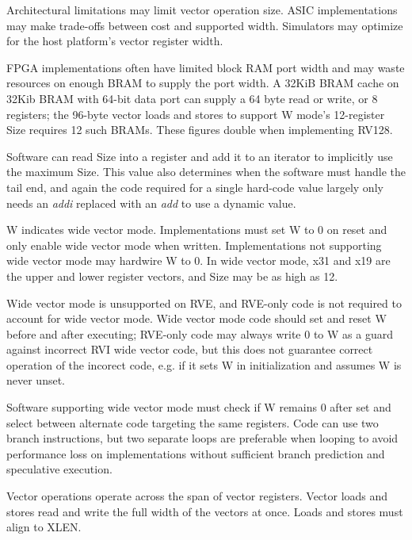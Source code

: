 \begin{commentary}

    Architectural limitations may limit vector operation size.  ASIC implementations
    may make trade-offs between cost and supported width.  Simulators may optimize
    for the host platform's vector register width.

    FPGA implementations often have limited block RAM port width and may waste
    resources on enough BRAM to supply the port width.  A 32KiB BRAM cache on 32Kib
    BRAM with 64-bit data port can supply a 64 byte read or write, or 8 registers;
    the 96-byte vector loads and stores to support W mode's 12-register Size
    requires 12 such BRAMs.  These figures double when implementing RV128.

    Software can read Size into a register and add it to an iterator to implicitly
    use the maximum Size.  This value also determines when the software must
    handle the tail end, and again the code required for a single hard-code value
    largely only needs an {\em addi} replaced with an {\em add} to use a dynamic
    value.

\end{commentary}

W indicates wide vector mode.  Implementations must set W to 0 on reset and only
enable wide vector mode when written.  Implementations not supporting wide vector
mode may hardwire W to 0.  In wide vector mode, x31 and x19 are the upper and
lower register vectors, and Size may be as high as 12.

\begin{commentary}
    Wide vector mode is unsupported on RVE, and RVE-only code is not required to
    account for wide vector mode.  Wide vector mode code should set and reset W
    before and after executing; RVE-only code may always write 0 to W as a
    guard against incorrect RVI wide vector code, but this does not guarantee
    correct operation of the incorect code, e.g. if it sets W in initialization
    and assumes W is never unset.

    Software supporting wide vector mode must check if W remains 0 after set
    and select between alternate code targeting the same registers.  Code can
    use two branch instructions, but two separate loops are preferable when
    looping to avoid performance loss on implementations without sufficient
    branch prediction and speculative execution.
\end{commentary}

Vector operations operate across the span of vector registers.  Vector loads and
stores read and write the full width of the vectors at once.  Loads and stores
must align to XLEN.

